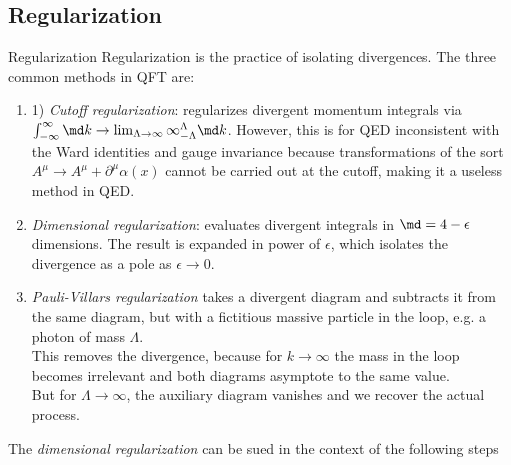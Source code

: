 \subsection{Regularization}
\begin{mybox}{Regularization}
	Regularization is the practice of isolating divergences. The three common methods in QFT are:
	\begin{enumerate}
		\item 1) \emph{Cutoff regularization}: regularizes divergent momentum integrals via $\int_{-\infty}^{\infty} \md k \rightarrow \lim_{\Lambda \rightarrow\infty} \infty_{-\Lambda}^{\Lambda} \md k$. However, this is for QED inconsistent with the Ward identities and gauge invariance because transformations of the sort $A^{\mu} \rightarrow A^{\mu} + \partial^{\mu} \alpha(x)$ cannot be carried out at the cutoff, making it a useless method in QED.
	\item \emph{Dimensional regularization}: evaluates divergent integrals in $\md =4-\epsilon$ dimensions. The result is expanded in power of $\epsilon$, which isolates the divergence as a pole as $\epsilon \rightarrow 0$.
	\item \emph{Pauli-Villars regularization} takes a divergent diagram and subtracts it from the same diagram, but with a fictitious massive particle in the loop, e.g. a photon of mass $\Lambda$.\\
	This removes the divergence, because for $k\rightarrow\infty$ the mass in the loop becomes irrelevant and both diagrams asymptote to the same value.\\
	But for $\Lambda \rightarrow \infty$, the auxiliary diagram vanishes and we recover the actual process.
	\end{enumerate}
\end{mybox}
The \emph{dimensional regularization} can be sued in the context of the following steps
